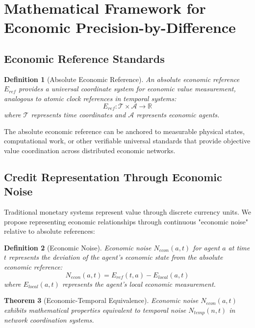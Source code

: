 \documentclass[12pt,a4paper]{article}
\newtheorem{theorem}{Theorem}[section]
\newtheorem{definition}[theorem]{Definition}
\begin{document}
\section{Mathematical Framework for Economic Precision-by-Difference}

\subsection{Economic Reference Standards}

\begin{definition}[Absolute Economic Reference]
An absolute economic reference $E_{ref}$ provides a universal coordinate system for economic value measurement, analogous to atomic clock references in temporal systems:
\begin{equation}
E_{ref}: \mathcal{T} \times \mathcal{A} \rightarrow \mathbb{R}
\end{equation}
where $\mathcal{T}$ represents time coordinates and $\mathcal{A}$ represents economic agents.
\end{definition}

The absolute economic reference can be anchored to measurable physical states, computational work, or other verifiable universal standards that provide objective value coordination across distributed economic networks.

\subsection{Credit Representation Through Economic Noise}

Traditional monetary systems represent value through discrete currency units. We propose representing economic relationships through continuous "economic noise" relative to absolute references:

\begin{definition}[Economic Noise]
Economic noise $N_{econ}(a,t)$ for agent $a$ at time $t$ represents the deviation of the agent's economic state from the absolute economic reference:
\begin{equation}
N_{econ}(a,t) = E_{ref}(t,a) - E_{local}(a,t)
\end{equation}
where $E_{local}(a,t)$ represents the agent's local economic measurement.
\end{definition}

\begin{theorem}[Economic-Temporal Equivalence]
Economic noise $N_{econ}(a,t)$ exhibits mathematical properties equivalent to temporal noise $N_{temp}(n,t)$ in network coordination systems.
\end{theorem}
\end{document}
